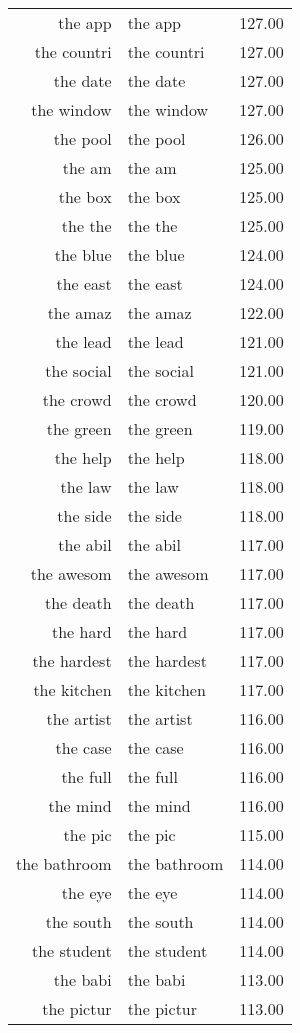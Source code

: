 \begin{table}[ht]
\begin{tabular}{rlr}
  the app & the app & 127.00 \\ 
  the countri & the countri & 127.00 \\ 
  the date & the date & 127.00 \\ 
  the window & the window & 127.00 \\ 
  the pool & the pool & 126.00 \\ 
  the am & the am & 125.00 \\ 
  the box & the box & 125.00 \\ 
  the the & the the & 125.00 \\ 
  the blue & the blue & 124.00 \\ 
  the east & the east & 124.00 \\ 
  the amaz & the amaz & 122.00 \\ 
  the lead & the lead & 121.00 \\ 
  the social & the social & 121.00 \\ 
  the crowd & the crowd & 120.00 \\ 
  the green & the green & 119.00 \\ 
  the help & the help & 118.00 \\ 
  the law & the law & 118.00 \\ 
  the side & the side & 118.00 \\ 
  the abil & the abil & 117.00 \\ 
  the awesom & the awesom & 117.00 \\ 
  the death & the death & 117.00 \\ 
  the hard & the hard & 117.00 \\ 
  the hardest & the hardest & 117.00 \\ 
  the kitchen & the kitchen & 117.00 \\ 
  the artist & the artist & 116.00 \\ 
  the case & the case & 116.00 \\ 
  the full & the full & 116.00 \\ 
  the mind & the mind & 116.00 \\ 
  the pic & the pic & 115.00 \\ 
  the bathroom & the bathroom & 114.00 \\ 
  the eye & the eye & 114.00 \\ 
  the south & the south & 114.00 \\ 
  the student & the student & 114.00 \\ 
  the babi & the babi & 113.00 \\ 
  the pictur & the pictur & 113.00 \\ 

\end{tabular}
\end{table}
